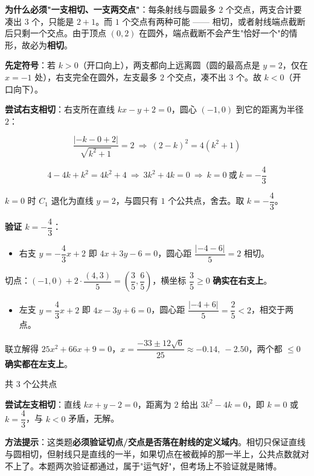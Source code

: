 \textbf{为什么必须"一支相切、一支两交点"}：每条射线与圆最多 $2$ 个交点，两支合计要凑出 $3$ 个，只能是 $2+1$。而 $1$ 个交点有两种可能 —— 相切，或者射线端点截断后只剩一个交点。由于顶点 $(0,2)$ 在圆外，端点截断不会产生"恰好一个"的情形，故必为\textbf{相切}。

\textbf{先定符号}：若 $k>0$（开口向上），两支都向上远离圆（圆的最高点是 $y=2$，仅在 $x=-1$ 处），右支完全在圆外，左支最多 $2$ 个交点，凑不出 $3$ 个。故 $k<0$（开口向下）。

\textbf{尝试右支相切}：右支所在直线 $kx-y+2=0$，圆心 $(-1,0)$ 到它的距离为半径 $2$：

\[\frac{|-k-0+2|}{\sqrt{k^{2}+1}}=2\ \Longrightarrow\ (2-k)^{2}=4\left(k^{2}+1\right)\]

\[4-4k+k^{2}=4k^{2}+4\ \Longrightarrow\ 3k^{2}+4k=0\ \Longrightarrow\ k=0\ \text{或}\ k=-\frac43\]

$k=0$ 时 $C_1$ 退化为直线 $y=2$，与圆只有 $1$ 个公共点，舍去。取 $k=-\dfrac43$。

\textbf{验证 $k=-\dfrac43$}：

\begin{itemize}
\item 右支 $y=-\dfrac43x+2$ 即 $4x+3y-6=0$，圆心距 $\dfrac{|-4-6|}5=2$  相切。
\end{itemize}
  切点：$(-1,0)+2\cdot\dfrac{(4,3)}5=\left(\dfrac35,\dfrac65\right)$，横坐标 $\dfrac35\ge0$  \textbf{确实在右支上}。
\begin{itemize}
\item 左支 $y=\dfrac43x+2$ 即 $4x-3y+6=0$，圆心距 $\dfrac{|-4+6|}5=\dfrac25<2$，相交于两点。
\end{itemize}
  联立解得 $25x^{2}+66x+9=0$，$x=\dfrac{-33\pm12\sqrt6}{25}\approx-0.14,\ -2.50$，两个都 $\le0$  \textbf{确实都在左支上}。

共 $3$ 个公共点 

\textbf{尝试左支相切}：直线 $kx+y-2=0$，距离为 $2$ 给出 $3k^{2}-4k=0$，即 $k=0$ 或 $k=\dfrac43$，与 $k<0$ 矛盾，无解。


\begin{gktip}
\textbf{方法提示}：这类题\textbf{必须验证切点/交点是否落在射线的定义域内}。相切只保证直线与圆相切，但射线只是直线的一半，如果切点在被截掉的那一半上，公共点数就对不上了。本题两次验证都通过，属于"运气好"，但考场上不验证就是赌博。
\end{gktip}

\par\medskip

